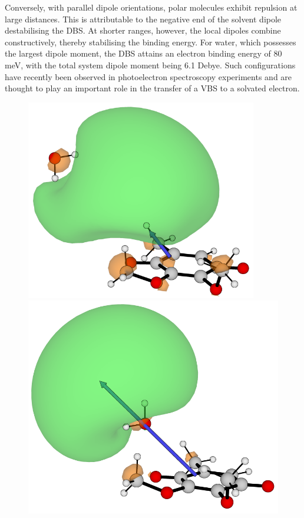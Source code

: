 Conversely, with parallel dipole orientations, polar molecules exhibit repulsion at large distances. This is attributable to the negative end of the solvent dipole destabilising the DBS. At shorter ranges, however, the local dipoles combine constructively, thereby stabilising the binding energy. For water, which possesses the largest dipole moment, the DBS attains an electron binding energy of 80 meV, with the total system dipole moment being 6.1 Debye. Such configurations have recently been observed in photoelectron spectroscopy experiments \cite{clarke2025role} and are thought to play an important role in the transfer of a VBS to a solvated electron.

\begin{figure}[h]
  \centering
    \begin{minipage}[b]{0.3\textwidth}
    \centering
      \includegraphics[width=0.9\textwidth]{chapters/results/image/Q0_H2O_H.png}
  \end{minipage}
  \hfill
  \begin{minipage}[b]{0.3\textwidth}
    \centering
    \includegraphics[width=1\textwidth]{chapters/results/image/Q0_H2O_O.png}

\end{minipage}
\end{figure}
